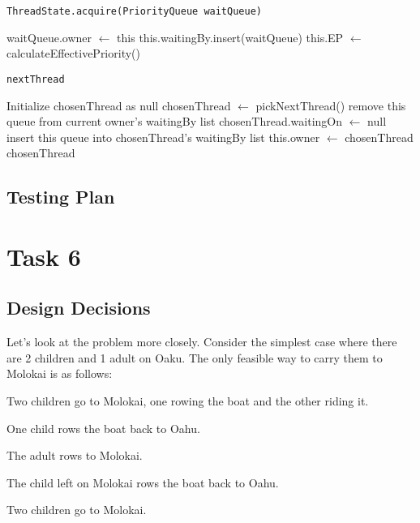\documentclass{article}
\begin{document}
\begin{spacing}{1.1}
    \begin{algorithm}
      \caption{\texttt{ThreadState.acquire(PriorityQueue waitQueue)}}
      \begin{algorithmic}[1]
	\STATE waitQueue.owner $\leftarrow$ this
	\STATE this.waitingBy.insert(waitQueue)
	\STATE this.EP $\leftarrow$ calculateEffectivePriority()  
	\RETURN
      \end{algorithmic}
    \end{algorithm}

    \begin{algorithm}
      \caption{\texttt{nextThread}}
      \begin{algorithmic}[1]
	\STATE Initialize chosenThread as null
	\STATE chosenThread $\leftarrow$ pickNextThread()
	\STATE remove this queue from current owner's waitingBy list
	\STATE chosenThread.waitingOn $\leftarrow$ null
	\STATE insert this queue into chosenThread's waitingBy list
	\ENDIF
	\STATE this.owner $\leftarrow$ chosenThread
	\RETURN chosenThread
      \end{algorithmic}
    \end{algorithm}

    \subsection{Testing Plan}

    \section{Task 6}

    \subsection{Design Decisions}
    Let's look at the problem more closely. Consider the simplest case where there are 2 children and 1 adult on Oaku. The only feasible way to carry them to Molokai is as follows:
    \begin{asparaitem}
    \item Two children go to Molokai, one rowing the boat and the other riding it.\\
    \item One child rows the boat back to Oahu.\\
    \item The adult rows to Molokai.\\
    \item The child left on Molokai rows the boat back to Oahu.\\
    \item Two children go to Molokai.\\
    \end{asparaitem}


\end{spacing}
\end{document}
